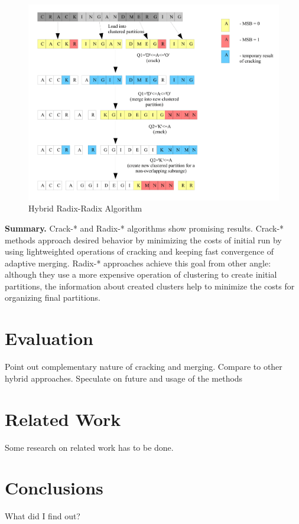 \documentclass[10pt, conference, compsocconf]{IEEEtran}
\begin{document}
\begin{figure}[h]
\centering
\includegraphics[width=\columnwidth]{hrr.png}
\caption{Hybrid Radix-Radix Algorithm}
\end{figure}

\textbf{Summary.} Crack-* and Radix-* algorithms show promising results. Crack-* methods approach desired behavior by minimizing the costs of initial run by using lightweighted operations of cracking and keeping fast convergence of adaptive merging. Radix-* approaches achieve this goal from other angle: although they use a more expensive operation of clustering to create initial partitions, the information about created clusters help to minimize the costs for organizing final partitions.

\section{Evaluation}
\label{sec:eval}
Point out complementary nature of cracking and merging. Compare to other hybrid approaches. Speculate on future and usage of the methods

\section{Related Work}
\label{sec:rel}
Some research on related work has to be done.

\section{Conclusions}
\label{sec:conc}
What did I find out?
\end{document}
